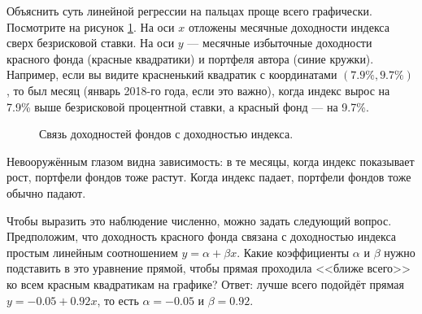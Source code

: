 Объяснить суть линейной регрессии на пальцах проще всего графически. Посмотрите на рисунок \ref{fund_regression_figure}. На оси $x$ отложены месячные доходности индекса сверх безрисковой ставки. На оси $y$ --- месячные избыточные доходности красного фонда (красные квадратики) и портфеля автора (синие кружки). Например, если вы видите красненький квадратик с координатами $(7.9\%, 9.7\%)$, то был месяц (январь 2018-го года, если это важно), когда индекс вырос на 7.9\% выше безрисковой процентной ставки, а красный фонд --- на 9.7\%.

\begin{figure}[h]
\centering
{}
\caption{Связь доходностей фондов с доходностью индекса.}
\label{fund_regression_figure}
\end{figure}

Невооружённым глазом видна зависимость: в те месяцы, когда индекс показывает рост, портфели фондов тоже растут. Когда индекс падает, портфели фондов тоже обычно падают.

Чтобы выразить это наблюдение численно, можно задать следующий вопрос. Предположим, что доходность красного фонда связана с доходностью индекса простым линейным соотношением $y = \alpha + \beta x$. Какие коэффициенты $\alpha$ и $\beta$ нужно подставить в это уравнение прямой, чтобы прямая проходила <<ближе всего>> ко всем красным квадратикам на графике? Ответ: лучше всего подойдёт прямая $y = -0.05 + 0.92x$, то есть $\alpha = -0.05$ и $\beta=0.92$.

